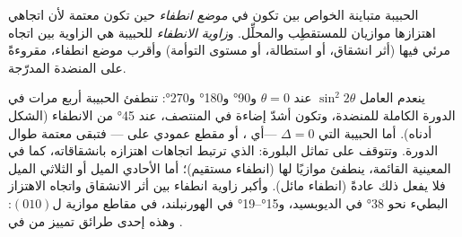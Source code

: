 \begin{definition}\label{def:b1:optical-mineralogy:extinction}
الحبيبة متباينة الخواص بين  تكون في \emph{موضع انطفاء} حين تكون معتمة لأن اتجاهي اهتزازها موازيان للمستقطِب والمحلِّل. و\emph{زاوية الانطفاء} للحبيبة هي الزاوية بين اتجاه مرئي فيها (أثر انشقاق، أو استطالة، أو مستوى التوأمة) وأقرب موضع انطفاء، مقروءةً على المنضدة المدرّجة.
\end{definition}

ينعدم العامل $\sin^2 2\theta$ عند $\theta = 0$ و\ang{90} و\ang{180} و\ang{270}: تنطفئ الحبيبة أربع مرات في الدورة الكاملة للمنضدة، وتكون أشدّ إضاءة في المنتصف، عند \ang{45} من الانطفاء (الشكل أدناه). أما الحبيبة التي $\Delta = 0$ —أي ، أو مقطع عمودي على — فتبقى معتمة طوال الدورة. وتتوقف  على تماثل البلورة:  الذي ترتبط اتجاهات اهتزازه بانشقاقاته، كما في  المعينية القائمة، ينطفئ موازيًا لها (انطفاء مستقيم)؛ أما الأحادي الميل أو الثلاثي الميل فلا يفعل ذلك عادةً (انطفاء مائل). وأكبر زاوية انطفاء بين أثر الانشقاق واتجاه الاهتزاز البطيء نحو \ang{38} في الديوبسيد، و\ang{15}--\ang{19} في الهورنبلند، في مقاطع موازية ل$(010)$: وهذه إحدى طرائق تمييز  من  في .

